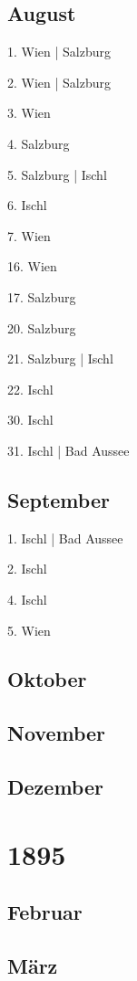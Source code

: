 \documentclass[twoside=false,titlepage=false,open=any, parskip=never, fontsize=10pt, headings=small, chapterprefix=false, appendixprefix=false, DIV=15]{scrbook}
\begin{document}
\begin{multicols}{3}
            \section*{August}
            1. Wien | Salzburg\par
            2. Wien | Salzburg\par
            3. Wien\par
            4. Salzburg\par
            5. Salzburg | Ischl\par
            6. Ischl\par
            7. Wien\par
            16. Wien\par
            17. Salzburg\par
            20. Salzburg\par
            21. Salzburg | Ischl\par
            22. Ischl\par
            30. Ischl\par
            31. Ischl | Bad Aussee\par
            \section*{September}
            1. Ischl | Bad Aussee\par
            2. Ischl\par
            4. Ischl\par
            5. Wien\par
            \section*{Oktober}
            \section*{November}
            \section*{Dezember}
            \chapter*{1895}
            \section*{Februar}
            \section*{März}

\end{multicols}
\end{document}
